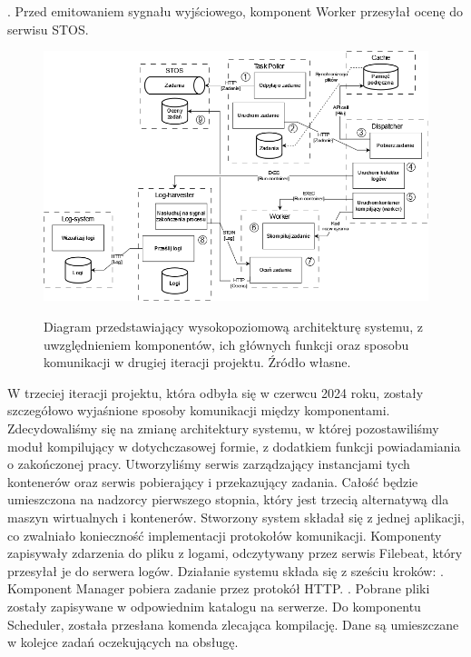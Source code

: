 \newline {}. Przed emitowaniem sygnału wyjściowego, komponent Worker przesyłał ocenę do serwisu STOS.
\begin{figure}[!h]
	\begin{center}
		\resizebox{1.0\textwidth}{!} {
			\includegraphics{img/1/i2_arch.png}
		}
		\caption[Architektura po drugiej iteracji]{Diagram przedstawiający wysokopoziomową architekturę systemu, z uwzględnieniem komponentów, ich głównych funkcji oraz sposobu komunikacji w drugiej iteracji projektu. Źródło własne.}
	\end{center}
\end{figure}
\newline \indent W trzeciej iteracji projektu, która odbyła się w czerwcu 2024 roku, zostały szczegółowo wyjaśnione sposoby komunikacji między komponentami. Zdecydowaliśmy się na zmianę architektury systemu, w której pozostawiliśmy moduł kompilujący w dotychczasowej formie, z dodatkiem funkcji powiadamiania o zakończonej pracy. Utworzyliśmy serwis zarządzający instancjami tych kontenerów oraz serwis pobierający i przekazujący zadania. Całość będzie umieszczona na nadzorcy pierwszego stopnia, który jest trzecią alternatywą dla maszyn wirtualnych i kontenerów. Stworzony system składał się z jednej aplikacji, co zwalniało konieczność implementacji protokołów komunikacji. Komponenty zapisywały zdarzenia do pliku z logami, odczytywany przez serwis Filebeat, który przesyłał je do serwera logów. Działanie systemu składa się z sześciu kroków:
\newline {}. Komponent Manager pobiera zadanie przez protokół HTTP.
\newline {}. Pobrane pliki zostały zapisywane w odpowiednim katalogu na serwerze. Do komponentu Scheduler, została przesłana komenda zlecająca kompilację. Dane są umieszczane w kolejce zadań oczekujących na obsługę.
